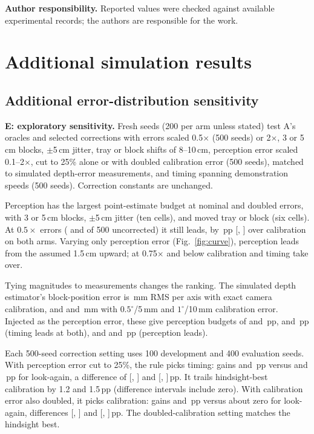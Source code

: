 \documentclass{article}
\newcommand{\pp}{\,pp}
\begin{document}
\textbf{Author responsibility.} Reported values were checked against available experimental records; the authors are responsible for the work.

\clearpage
{}


\clearpage
\appendix
\section{Additional simulation results}

\subsection{Additional error-distribution sensitivity}
\label{app:sensitivity}
\textbf{E: exploratory sensitivity.} Fresh seeds (200 per arm unless stated) test A's oracles and selected corrections with errors scaled 0.5$\times$ (500 seeds) or 2$\times$, 3 or 5\,cm blocks, $\pm$5\,cm jitter, tray or block shifts of 8--10\,cm,
perception error scaled 0.1--2$\times$, cut to 25\% alone or with doubled calibration error (500 seeds), matched to simulated depth-error measurements, and timing spanning demonstration speeds (500 seeds). Correction constants are unchanged.

Perception has the largest point-estimate budget at nominal and doubled errors, with 3 or 5\,cm blocks, $\pm$5\,cm jitter (ten cells), and moved tray or block (six cells).
At $0.5\times$ errors (\ehFullFive{} and \ehFullTen{} of 500 uncorrected) it still leads, by \ehMarginFive\pp{} [\ehMarginLoFive, \ehMarginHiFive] over calibration on both arms.
Varying only perception error (Fig.~\ref{fig:curve}), perception leads from the assumed 1.5\,cm upward; at 0.75$\times$ and below calibration and timing take over.

Tying magnitudes to measurements changes the ranking. The simulated depth estimator's block-position error is \mmNom\,mm RMS per axis with exact camera calibration, and \mmHalf{} and \mmOne\,mm with $0.5^\circ$/5\,mm and $1^\circ$/10\,mm calibration error.
Injected as the perception error, these give perception budgets of \DnNomPercFive{} and \DnNomPercTen\pp{}, \DnHalfPercFive{} and \DnHalfPercTen\pp{} (timing leads at both), and \DnOnePercFive{} and \DnOnePercTen\pp{} (perception leads).

Each 500-seed correction setting uses 100 development and 400 evaluation seeds.
With perception error cut to 25\%, the rule picks timing: gains \rpA{} and \rpB\pp{} versus \rlA{} and \rlB\pp{} for look-again, a difference of \rdA{} [\rdAlo, \rdAhi] and \rdB{} [\rdBlo, \rdBhi]\pp{}.
It trails hindsight-best calibration by 1.2 and 1.5\pp{} (difference intervals include zero).
With calibration error also doubled, it picks calibration: gains \rcA{} and \rcB\pp{} versus about zero for look-again, differences \reA{} [\reAlo, \reAhi] and \reB{} [\reBlo, \reBhi]\pp{}.
The doubled-calibration setting matches the hindsight best.
\end{document}
